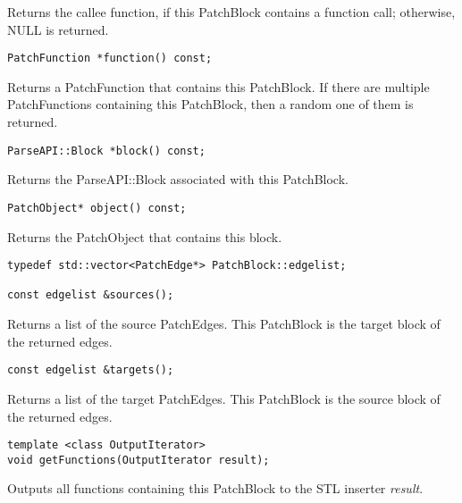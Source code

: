 Returns the callee function, if this PatchBlock contains a function call;
otherwise, NULL is returned.


\begin{verbatim}
PatchFunction *function() const;

\end{verbatim}



Returns a PatchFunction that contains this PatchBlock. If there are multiple
PatchFunctions containing this PatchBlock, then a random one of them is
returned.


\begin{verbatim}
ParseAPI::Block *block() const;

\end{verbatim}



Returns the ParseAPI::Block associated with this PatchBlock.


\begin{verbatim}
PatchObject* object() const;

\end{verbatim}



Returns the PatchObject that contains this block.


\begin{verbatim}
typedef std::vector<PatchEdge*> PatchBlock::edgelist;

const edgelist &sources();

\end{verbatim}



Returns a list of the source PatchEdges. This PatchBlock is the target block of
the returned edges.


\begin{verbatim}
const edgelist &targets();

\end{verbatim}



Returns a list of the target PatchEdges. This PatchBlock is the source block of
the returned edges.


\begin{verbatim}
template <class OutputIterator>
void getFunctions(OutputIterator result);

\end{verbatim}



Outputs all functions containing this PatchBlock to the STL inserter \emph{result}.


